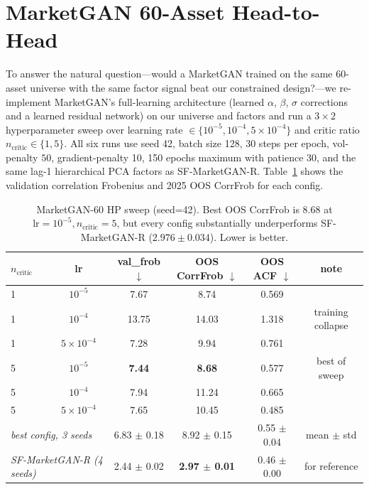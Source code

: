 \section{MarketGAN 60-Asset Head-to-Head}
\label{app:marketgan60}

To answer the natural question---would a MarketGAN trained on the same 60-asset universe with the same factor signal beat our constrained design?---we re-implement MarketGAN's full-learning architecture (learned $\alpha$, $\beta$, $\sigma$ corrections and a learned residual network) on our universe and factors and run a $3 \times 2$ hyperparameter sweep over learning rate $\in \{10^{-5}, 10^{-4}, 5 \times 10^{-4}\}$ and critic ratio $n_{\text{critic}} \in \{1, 5\}$. All six runs use seed 42, batch size 128, 30 steps per epoch, vol-penalty $50$, gradient-penalty 10, 150 epochs maximum with patience 30, and the same lag-1 hierarchical PCA factors as SF-MarketGAN-R. Table~\ref{tab:marketgan60_sweep} shows the validation correlation Frobenius and 2025 OOS CorrFrob for each config.

\begin{table}[h]
\centering
\caption{MarketGAN-60 HP sweep (seed=42). Best OOS CorrFrob is $8.68$ at $\text{lr}=10^{-5}, n_{\text{critic}}=5$, but every config substantially underperforms SF-MarketGAN-R ($2.976 \pm 0.034$). Lower is better.}
\label{tab:marketgan60_sweep}
\small
\begin{tabular}{lccccc}
\toprule
$n_{\text{critic}}$ & lr & val\_frob $\downarrow$ & OOS CorrFrob $\downarrow$ & OOS ACF $\downarrow$ & note \\
\midrule
1 & $10^{-5}$ & 7.67  & 8.74  & 0.569 & \\
1 & $10^{-4}$ & 13.75 & 14.03 & 1.318 & training collapse \\
1 & $5\times10^{-4}$ & 7.28 & 9.94 & 0.761 & \\
5 & $10^{-5}$ & \textbf{7.44} & \textbf{8.68} & 0.577 & best of sweep \\
5 & $10^{-4}$ & 7.94 & 11.24 & 0.665 & \\
5 & $5\times10^{-4}$ & 7.65 & 10.45 & 0.485 & \\
\midrule
\multicolumn{2}{l}{\emph{best config, 3 seeds}} & 6.83 $\pm$ 0.18 & 8.92 $\pm$ 0.15 & 0.55 $\pm$ 0.04 & mean $\pm$ std \\
\midrule
\multicolumn{2}{l}{\emph{SF-MarketGAN-R (4 seeds)}} & 2.44 $\pm$ 0.02 & \textbf{2.97 $\pm$ 0.01} & 0.46 $\pm$ 0.00 & for reference \\
\bottomrule
\end{tabular}
\end{table}

